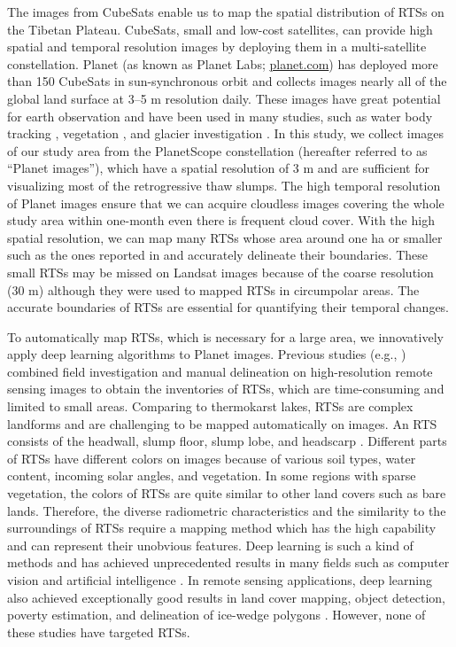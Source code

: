 \documentclass[preprint,12pt,authoryear]{elsarticle}
\begin{document}
The images from CubeSats enable us to map the spatial distribution of RTSs on the Tibetan Plateau. CubeSats, small and low-cost satellites, can provide high spatial and temporal resolution images by deploying them in a multi-satellite constellation. Planet (as known as Planet Labs; \url{planet.com}) has deployed more than 150 CubeSats in sun-synchronous orbit and collects images nearly all of the global land surface at 3--5 m resolution daily. These images have great potential for earth observation and have been used in many studies, such as water body tracking \citep{cooley2017tracking, cooley2019arctic, aragon2018cubesats, miles2018glacial}, vegetation \citep{houborg2016high, houborg2018daily}, and glacier investigation \citep{altena2017glacier}. In this study, we collect images of our study area from the PlanetScope constellation (hereafter referred to as “Planet images”), which have a spatial resolution of 3 m and are sufficient for visualizing most of the retrogressive thaw slumps. The high temporal resolution of Planet images ensure that we can acquire cloudless images covering the whole study area within one-month even there is frequent cloud cover. With the high spatial resolution, we can map many RTSs whose area around one ha or smaller such as the ones reported in \citep{niu2012development,niu2016thaw} and accurately delineate their boundaries. These small RTSs may be missed on Landsat images because of the coarse resolution (30 m) although they were used to mapped RTSs in circumpolar areas\citep{lacelle_distribution_2015, brooker2014mapping, nitze2018remote}. The accurate boundaries of RTSs are essential for quantifying their temporal changes. 

To automatically map RTSs, which is necessary for a large area, we innovatively apply deep learning algorithms to Planet images. Previous studies (e.g., \citealp{ramage_terrain_2017, lantuit_fifty_2008, niu2014thaw}) combined field investigation and manual delineation on high-resolution remote sensing images to obtain the inventories of RTSs, which are time-consuming and limited to small areas. Comparing to thermokarst lakes, RTSs are complex landforms and are challenging to be mapped automatically on images. An RTS consists of the headwall, slump floor, slump lobe, and headscarp \citep{lantuit_fifty_2008}. Different parts of RTSs have different colors on images because of various soil types, water content, incoming solar angles, and vegetation. In some regions with sparse vegetation, the colors of RTSs are quite similar to other land covers such as bare lands. Therefore, the diverse radiometric characteristics and the similarity to the surroundings of RTSs require a mapping method which has the high capability and can represent their unobvious features. Deep learning is such a kind of methods and has achieved unprecedented results in many fields such as computer vision and artificial intelligence \citep{krizhevsky_imagenet_2012, lecun_deep_2015, silver_mastering_2017}. In remote sensing applications, deep learning also achieved exceptionally good results in land cover mapping, object detection, poverty estimation, and delineation of ice-wedge polygons \citep{jean_combining_2016, guo_geospatial_2018, zhang2018deep}. However, none of these studies have targeted RTSs. 
\end{document}
